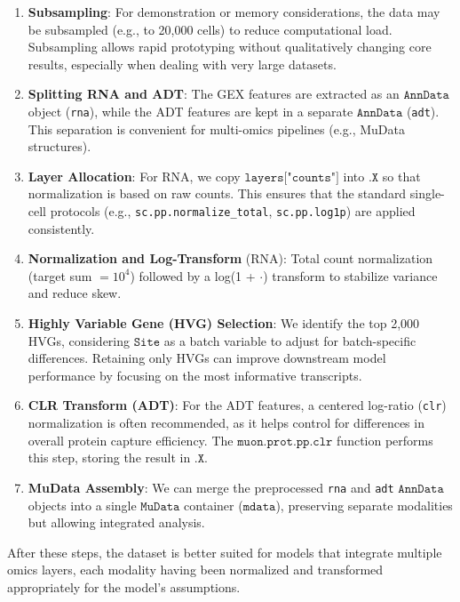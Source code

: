 \documentclass{article}
\begin{document}
\begin{enumerate}
    \item \textbf{Subsampling}: For demonstration or memory considerations, the data may be subsampled 
    (e.g., to 20,000 cells) to reduce computational load. Subsampling allows rapid prototyping 
    without qualitatively changing core results, especially when dealing with very large datasets.
    \item \textbf{Splitting RNA and ADT}: The GEX features are extracted as an \(\texttt{AnnData}\) object (\texttt{rna}), 
    while the ADT features are kept in a separate \(\texttt{AnnData}\) (\texttt{adt}). 
    This separation is convenient for multi-omics pipelines (e.g., MuData structures).
    \item \textbf{Layer Allocation}: For RNA, we copy \(\texttt{layers["counts"]}\) into \(\texttt{.X}\) so that normalization 
    is based on raw counts. This ensures that the standard single-cell protocols (e.g., \texttt{sc.pp.normalize\_total}, \texttt{sc.pp.log1p}) are applied consistently.
    \item \textbf{Normalization and Log-Transform} (RNA): 
    Total count normalization (target sum \(= 10^4\)) followed by a log(1 + \(\cdot\)) transform 
    to stabilize variance and reduce skew.
    \item \textbf{Highly Variable Gene (HVG) Selection}: 
    We identify the top 2,000 HVGs, considering \(\texttt{Site}\) as a batch variable to adjust for batch-specific differences. 
    Retaining only HVGs can improve downstream model performance by focusing on the most informative transcripts.
    \item \textbf{CLR Transform (ADT)}: For the ADT features, a centered log-ratio (\texttt{clr}) normalization 
    is often recommended, as it helps control for differences in overall protein capture efficiency. 
    The \(\texttt{muon.prot.pp.clr}\) function performs this step, storing the result in \(\texttt{.X}\).
    \item \textbf{MuData Assembly}: We can merge the preprocessed \texttt{rna} and \texttt{adt} \(\texttt{AnnData}\) objects 
    into a single \(\texttt{MuData}\) container (\(\texttt{mdata}\)), preserving separate modalities but allowing integrated analysis.
\end{enumerate}

After these steps, the dataset is better suited for models that integrate multiple omics layers, 
each modality having been normalized and transformed appropriately for the model’s assumptions.
\end{document}
